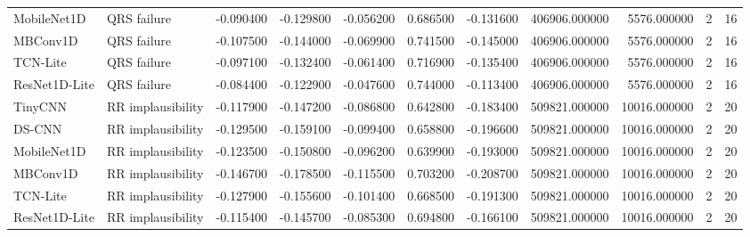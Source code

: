 \begin{table}
\begin{tabular}{llrrrrrrrrr}
\cline{1-11}
MobileNet1D & QRS failure & -0.090400 & -0.129800 & -0.056200 & 0.686500 & -0.131600 & 406906.000000 & 5576.000000 & 2 & 16 \\
\cline{1-11}
MBConv1D & QRS failure & -0.107500 & -0.144000 & -0.069900 & 0.741500 & -0.145000 & 406906.000000 & 5576.000000 & 2 & 16 \\
\cline{1-11}
TCN-Lite & QRS failure & -0.097100 & -0.132400 & -0.061400 & 0.716900 & -0.135400 & 406906.000000 & 5576.000000 & 2 & 16 \\
\cline{1-11}
ResNet1D-Lite & QRS failure & -0.084400 & -0.122900 & -0.047600 & 0.744000 & -0.113400 & 406906.000000 & 5576.000000 & 2 & 16 \\
\cline{1-11}
TinyCNN & RR implausibility & -0.117900 & -0.147200 & -0.086800 & 0.642800 & -0.183400 & 509821.000000 & 10016.000000 & 2 & 20 \\
\cline{1-11}
DS-CNN & RR implausibility & -0.129500 & -0.159100 & -0.099400 & 0.658800 & -0.196600 & 509821.000000 & 10016.000000 & 2 & 20 \\
\cline{1-11}
MobileNet1D & RR implausibility & -0.123500 & -0.150800 & -0.096200 & 0.639900 & -0.193000 & 509821.000000 & 10016.000000 & 2 & 20 \\
\cline{1-11}
MBConv1D & RR implausibility & -0.146700 & -0.178500 & -0.115500 & 0.703200 & -0.208700 & 509821.000000 & 10016.000000 & 2 & 20 \\
\cline{1-11}
TCN-Lite & RR implausibility & -0.127900 & -0.155600 & -0.101400 & 0.668500 & -0.191300 & 509821.000000 & 10016.000000 & 2 & 20 \\
\cline{1-11}
ResNet1D-Lite & RR implausibility & -0.115400 & -0.145700 & -0.085300 & 0.694800 & -0.166100 & 509821.000000 & 10016.000000 & 2 & 20 \\
\cline{1-11}
\bottomrule
\end{tabular}
\end{table}
